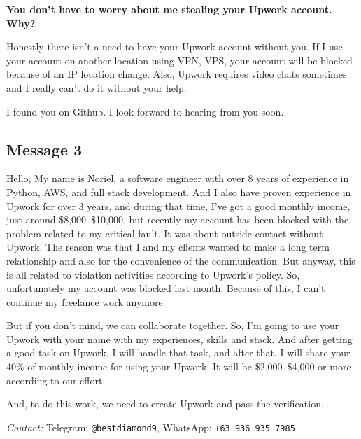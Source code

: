 \documentclass[11pt]{article}
\newcommand{\sender}[2]{%
  \medskip
  \noindent{\small\textbf{From:} #1 \hfill \textbf{Date:} #2}\par
  \smallskip
}
\begin{document}
\begin{msgbox}
\newpage

\smallskip\noindent\textbf{You don't have to worry about me stealing your Upwork
account. Why?}

Honestly there isn't a need to have your Upwork account without you. If I use
your account on another location using VPN, VPS, your account will be blocked
because of an IP location change. Also, Upwork requires video chats sometimes
and I really can't do it without your help.

\smallskip
I found you on Github. I look forward to hearing from you soon.
\end{msgbox}

\subsection*{Message 3}

\sender{Evan North [Noriel]}{2025-10-09}

\begin{msgbox}
Hello, My name is Noriel, a software engineer with over 8 years of experience
in Python, AWS, and full stack development. And I also have proven experience in
Upwork for over 3 years, and during that time, I've got a good monthly income,
just around \$8{,}000–\$10{,}000, but recently my account has been blocked with
the problem related to my critical fault. It was about outside contact without
Upwork. The reason was that I and my clients wanted to make a long term
relationship and also for the convenience of the communication. But anyway, this
is all related to violation activities according to Upwork's policy. So,
unfortunately my account was blocked last month. Because of this, I can't
continue my freelance work anymore.

But if you don't mind, we can collaborate together. So, I'm going to use your
Upwork with your name with my experiences, skills and stack. And after getting a
good task on Upwork, I will handle that task, and after that, I will share your
40\% of monthly income for using your Upwork. It will be
\$2{,}000–\$4{,}000 or more according to our effort.

And, to do this work, we need to create Upwork and pass the verification.

\smallskip
\noindent\textit{Contact:} Telegram: \texttt{@bestdiamond9},
WhatsApp: \texttt{+63 936 935 7985}
\end{msgbox}


\newpage
\end{document}
